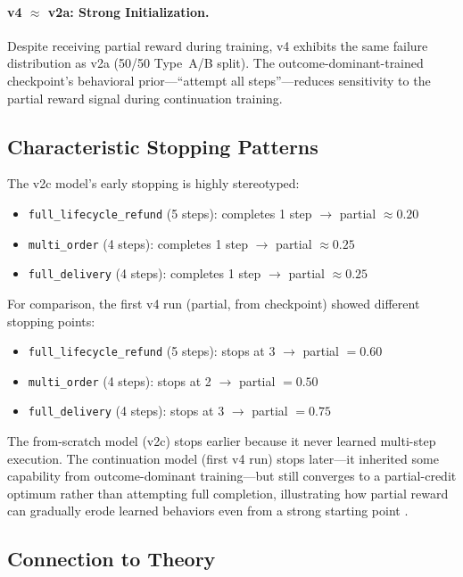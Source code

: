 \documentclass[11pt]{article}
\begin{document}
\paragraph{v4 $\approx$ v2a: Strong Initialization.}
Despite receiving partial reward during training, v4 exhibits the same failure distribution as v2a (50/50 Type~A/B split).
The outcome-dominant-trained checkpoint's behavioral prior---``attempt all steps''---reduces sensitivity to the partial reward signal during continuation training.

\subsection{Characteristic Stopping Patterns}

The v2c model's early stopping is highly stereotyped:
\begin{itemize}[leftmargin=*,itemsep=1pt]
  \item \texttt{full\_lifecycle\_refund} (5 steps): completes 1 step $\to$ partial $\approx 0.20$
  \item \texttt{multi\_order} (4 steps): completes 1 step $\to$ partial $\approx 0.25$
  \item \texttt{full\_delivery} (4 steps): completes 1 step $\to$ partial $\approx 0.25$
\end{itemize}

For comparison, the first v4 run (partial, from checkpoint) showed different stopping points:
\begin{itemize}[leftmargin=*,itemsep=1pt]
  \item \texttt{full\_lifecycle\_refund} (5 steps): stops at 3 $\to$ partial $= 0.60$
  \item \texttt{multi\_order} (4 steps): stops at 2 $\to$ partial $= 0.50$
  \item \texttt{full\_delivery} (4 steps): stops at 3 $\to$ partial $= 0.75$
\end{itemize}

The from-scratch model (v2c) stops earlier because it never learned multi-step execution.
The continuation model (first v4 run) stops later---it inherited some capability from outcome-dominant training---but still converges to a partial-credit optimum rather than attempting full completion, illustrating how partial reward can gradually erode learned behaviors even from a strong starting point \citep{gao2024designing}.

\subsection{Connection to Theory}
\end{document}
